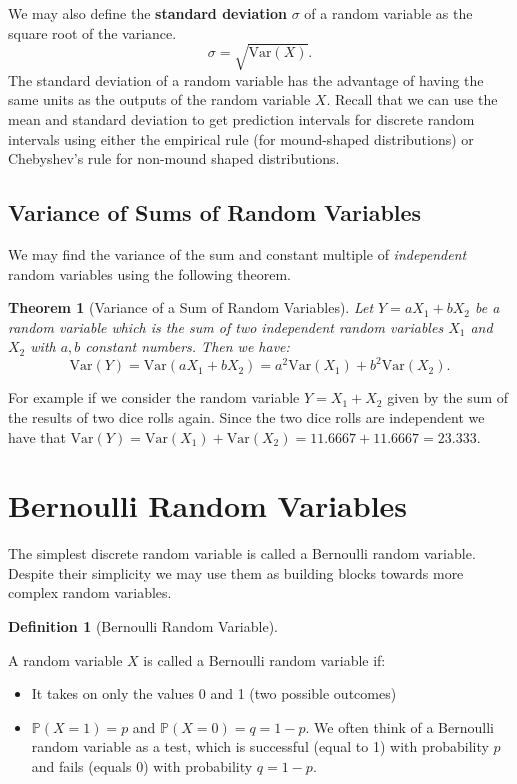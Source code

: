 \documentclass[
]{book}
\providecommand{\tightlist}{%
  \setlength{\itemsep}{0pt}\setlength{\parskip}{0pt}}
\newcommand{\var}{\mathrm{Var}}
\newcommand{\prob}[1]{{\mathbb{P}(#1)}}
\newtheorem{theorem}{Theorem}[chapter]
\theoremstyle{definition}
\newtheorem{definition}{Definition}[chapter]
\theoremstyle{definition}
\theoremstyle{definition}
\theoremstyle{definition}
\theoremstyle{remark}
\begin{document}
We may also define the \textbf{standard deviation} \(\sigma\) of a random variable as the square root of the variance. \[\sigma=\sqrt{\var(X)}.\] The standard deviation of a random variable has the advantage of having the same units as the outputs of the random variable \(X\). Recall that we can use the mean and standard deviation to get prediction intervals for discrete random intervals using either the empirical rule (for mound-shaped distributions) or Chebyshev's rule for non-mound shaped distributions.

\hypertarget{variance-of-sums-of-random-variables}{%
\subsection{Variance of Sums of Random Variables}\label{variance-of-sums-of-random-variables}}

We may find the variance of the sum and constant multiple of \emph{independent} random variables using the following theorem.

\begin{theorem}[Variance of a Sum of Random Variables]
\protect\hypertarget{thm:unnamed-chunk-272}{}\label{thm:unnamed-chunk-272}Let \(Y=aX_1+bX_2\) be a random variable which is the sum of two independent random variables \(X_1\) and \(X_2\) with \(a,b\) constant numbers. Then we have:
\[\var(Y)=\var(aX_1+bX_2)=a^2 \var(X_1)+b^2 \var(X_2).\]
\end{theorem}

For example if we consider the random variable \(Y=X_1+X_2\) given by the sum of the results of two dice rolls again. Since the two dice rolls are independent we have that \(\var(Y)=\var(X_1)+\var(X_2)=11.6667+11.6667=23.333\).

\hypertarget{bernoulli-random-variables}{%
\section{Bernoulli Random Variables}\label{bernoulli-random-variables}}

The simplest discrete random variable is called a Bernoulli random variable. Despite their simplicity we may use them as building blocks towards more complex random variables.

\begin{definition}[Bernoulli Random Variable]
\protect\hypertarget{def:unnamed-chunk-273}{}\label{def:unnamed-chunk-273}

A random variable \(X\) is called a Bernoulli random variable if:

\begin{itemize}
\tightlist
\item
  It takes on only the values 0 and 1 (two possible outcomes)
\item
  \(\prob{X=1}=p\) and \(\prob{X=0}=q=1-p\).
  We often think of a Bernoulli random variable as a test, which is successful (equal to 1) with probability \(p\) and fails (equals 0) with probability \(q=1-p\).
\end{itemize}

\end{definition}
\end{document}
